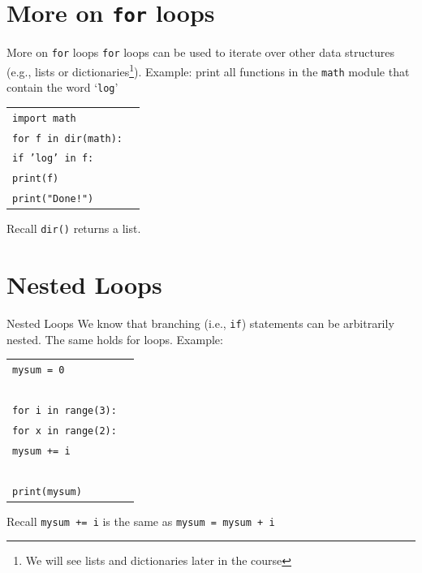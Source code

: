 \documentclass[t,handout,9pt]{beamer}
\begin{document}
\section{More on \texttt{for} loops}
\begin{frame}{More on \texttt{for} loops}
\vfill
\texttt{for} loops can be used to iterate over other data structures (e.g., lists or dictionaries\footnote{We will see lists and dictionaries later in the course}).
\vfill
Example: print all functions in the \texttt{math} module that contain the word `\texttt{log}'
\begin{table}[]
\begin{flushleft}
\begin{tabular}{ll}
\texttt{import math} &  \\
\texttt{for f in dir(math):} &  \\
\texttt{\qquad if 'log' in f:}        & \\
\texttt{\qquad\qquad print(f)}        & \\
\texttt{print("Done!")} &  \\
\end{tabular}
\end{flushleft}
\end{table}
\vfill
\begin{block}{Recall}
\texttt{dir()} returns a list.
\end{block}
\vfill
\end{frame}
%
\section{Nested Loops}
\begin{frame}{Nested Loops}
\vfill
We know that branching (i.e., \texttt{if}) statements can be arbitrarily nested. The same holds for loops.
\vfill
Example:
\begin{table}[]
\begin{flushleft}
\begin{tabular}{ll}
\texttt{mysum = 0} &  \\
\texttt{ } &  \\
\texttt{for i in range(3):} &  \\
\texttt{\qquad for x in range(2):}        & \\
\texttt{\qquad\qquad mysum += i}        & \\
\texttt{ } &  \\
\texttt{print(mysum)} &  \\
\end{tabular}
\end{flushleft}
\end{table}
\vfill
\begin{block}{Recall}
\texttt{mysum += i} is the same as \texttt{mysum = mysum + i}
\end{block}
\vfill
\end{frame}
%
\end{document}
